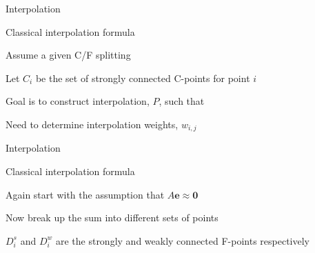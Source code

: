 \documentclass[18pt,xcolor=table]{beamer}
\begin{document}
\begin{frame}{Interpolation}
\begin{block}{Classical interpolation formula}
\bit
\item Assume a given C/F splitting
\item Let $C_i$ be the set of strongly connected C-points for point $i$
\item Goal is to construct interpolation, $P$, such that
\item Need to determine interpolation weights, $w_{i,j}$
\eit
\end{block}
\end{frame}

\begin{frame}{Interpolation}
\begin{block}{Classical interpolation formula}
\bit
\item Again start with the assumption that $A\mathbf{e} \approx \mathbf{0}$
\item Now break up the sum into different sets of points
\item $D^s_i$ and $D^w_i$ are the strongly and weakly connected F-points respectively
\eit
\end{block}
\end{frame}

\end{document}
